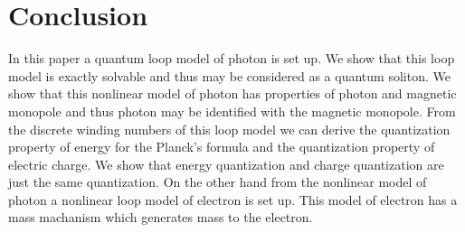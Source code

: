 \documentclass[a4paper,a4paper]{article}
\begin{document}
\section{Conclusion}

In this paper a quantum loop model of photon is set up. We show that this loop model is exactly solvable and thus may be considered as a quantum soliton. We show that this nonlinear model of photon has properties of photon and magnetic monopole and thus photon may be identified with the magnetic monopole. From the discrete winding numbers of this loop model we can derive the quantization property of energy for the Planck's formula and the quantization property of electric charge. We show that energy quantization and charge quantization are just the same quantization. On the other hand from the nonlinear model of photon a nonlinear loop model of electron is set up. This model of electron has a mass machanism which generates mass to the electron. 
\end{document}
